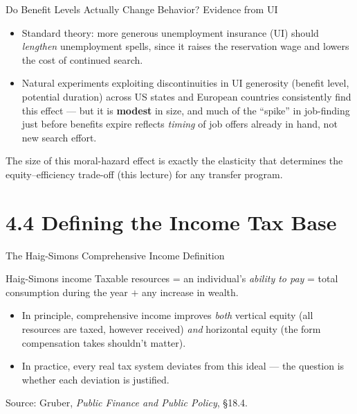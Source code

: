\documentclass[11pt,aspectratio=169]{beamer}
\newcommand{\srcnote}[1]{{\footnotesize\color{wugray}Source: #1}}
\begin{document}
\begin{frame}{Do Benefit Levels Actually Change Behavior? Evidence from UI}
  \footnotesize
  \begin{itemize}
    \item Standard theory: more generous unemployment insurance (UI) should \emph{lengthen} unemployment spells, since it raises the reservation wage and lowers the cost of continued search.
    \item Natural experiments exploiting discontinuities in UI generosity (benefit level, potential duration) across US states and European countries consistently find this effect --- but it is \textbf{modest} in size, and much of the ``spike'' in job-finding just before benefits expire reflects \emph{timing} of job offers already in hand, not new search effort.
  \end{itemize}
  \vspace{0.3em}
  \centering
  The size of this moral-hazard effect is exactly the elasticity that determines the equity--efficiency trade-off (this lecture) for any transfer program.
\end{frame}

\section{4.4 Defining the Income Tax Base}

\begin{frame}{The Haig-Simons Comprehensive Income Definition}
  \begin{block}{Haig-Simons income}
    Taxable resources = an individual's \emph{ability to pay} = total consumption during the year \(+\) any increase in wealth.
  \end{block}
  \vspace{0.3em}
  \begin{itemize}
    \item In principle, comprehensive income improves \emph{both} vertical equity (all resources are taxed, however received) \emph{and} horizontal equity (the form compensation takes shouldn't matter).
    \item In practice, every real tax system deviates from this ideal --- the question is whether each deviation is justified.
  \end{itemize}
  \srcnote{Gruber, \emph{Public Finance and Public Policy}, \S18.4.}
\end{frame}
\end{document}
